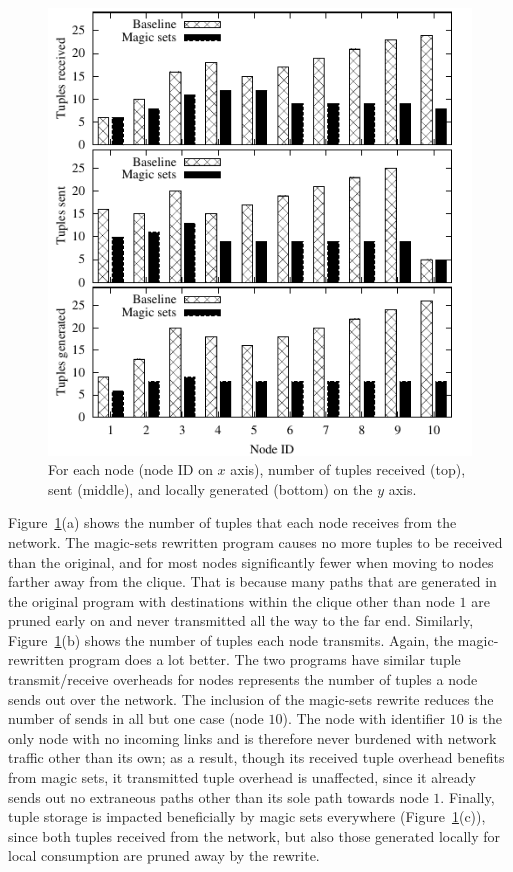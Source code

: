 \begin{figure}
\centering
\includegraphics{figures/magicNumbers}
\ssp
\caption{For each node (node ID on $x$ axis), number of tuples received
  (top), sent (middle), and locally generated (bottom) on the $y$ axis.}
\label{ch:evita:fig:magicresults}
\end{figure}

Figure~\ref{ch:evita:fig:magicresults}(a) shows the number of tuples that each node receives from
the network. The magic-sets rewritten program causes no more tuples to
be received than the original, and for most nodes significantly fewer
when moving to nodes farther away from the clique. That is because many
paths that are generated in the original program with destinations
within the clique other than node $1$ are pruned early on and never
transmitted all the way to the far end.    Similarly,
Figure~\ref{ch:evita:fig:magicresults}(b) shows the number of tuples each node transmits.
Again, the magic-rewritten program does a lot better.  The two programs
have similar tuple transmit/receive overheads for nodes represents the number of tuples a node sends out
over the network. The inclusion of the magic-sets rewrite reduces the number of sends
in all but one case (node $10$). The node with identifier $10$ is the only node with 
no incoming links and 
is therefore never burdened with network traffic other than its
own; as a result, though its received tuple overhead benefits from magic
sets, it transmitted tuple overhead is unaffected, since it already
sends out no extraneous paths other than its sole path towards node $1$.
Finally, tuple storage is impacted beneficially by magic sets everywhere
(Figure~\ref{ch:evita:fig:magicresults}(c)), since
both  tuples received from the network, but also those
generated locally for local consumption are pruned away by the rewrite.



